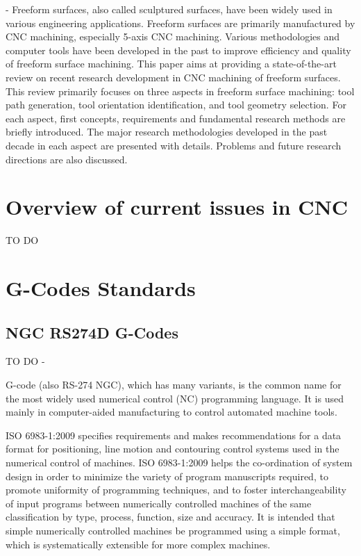\cite{Review_Lasemi_2010} -  Freeform surfaces, also called sculptured surfaces, have been widely used in various engineering applications. Freeform surfaces are primarily manufactured by CNC machining, especially 5-axis CNC machining. Various methodologies and computer tools have been developed in the past to improve efficiency and quality of freeform surface machining. This paper aims at providing a state-of-the-art review on recent research development in CNC machining of freeform surfaces. This review primarily focuses on three aspects in freeform surface machining: tool path generation, tool orientation identification, and tool geometry selection. For each aspect, first concepts, requirements and fundamental research methods are briefly introduced. The major research methodologies developed in the past decade in each aspect are presented with details. Problems and future research directions are also discussed.	
	


\section{Overview of current issues in CNC} 

TO DO

\section{G-Codes Standards}

\subsection{NGC RS274D G-Codes}

\begin{tcolorbox}
TO DO - 

G-code (also RS-274 NGC), which has many variants, is the common name for the most widely used numerical control (NC) programming language. It is used mainly in computer-aided manufacturing to control automated machine tools. 

ISO 6983-1:2009 specifies requirements and makes recommendations for a data format for positioning, line motion and contouring control systems used in the numerical control of machines. ISO 6983-1:2009 helps the co-ordination of system design in order to minimize the variety of program manuscripts required, to promote uniformity of programming techniques, and to foster interchangeability of input programs between numerically controlled machines of the same classification by type, process, function, size and accuracy. It is intended that simple numerically controlled machines be programmed using a simple format, which is systematically extensible for more complex machines.

\end{tcolorbox}

